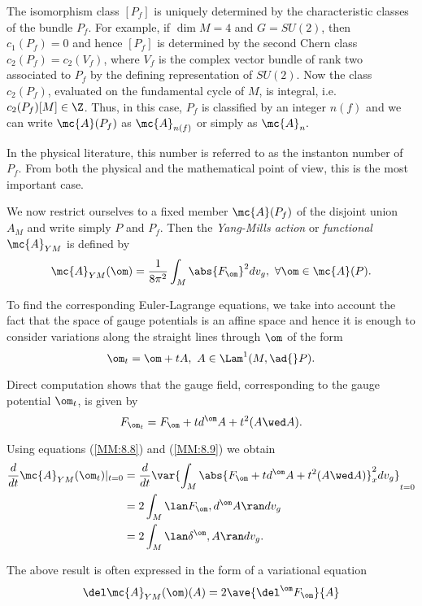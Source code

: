 The isomorphism class $[P_{f}]$ is uniquely determined by the characteristic classes of the bundle $P_{f}$. For
example, if $\dim M=4$ and $G=SU(2)$, then $c_{1}(P_{f})=0$ and hence $[P_{f}]$ is determined by the second Chern class
$c_{2}(P_{f})=c_{2}(V_{f})$, where $V_{f}$ is the complex vector bundle of rank two associated to $P_{f}$ by the
defining representation of $SU(2)$. Now the class $c_{2}(P_{f})$, evaluated on the fundamental cycle of $M$, is
integral, i.e. $c_{2}(P_{f})[M]\in \Z$. Thus, in this case, $P_{f}$ is classified by an integer $n(f)$ and we can write
$\mc{A}(P_{f})$ as $\mc{A}_{n(f)}$ or simply as $\mc{A}_{n}.$

In the physical literature, this number is referred to as the instanton number of $P_{f}$. From both the physical and
the mathematical point of view, this is the most important case.

We now restrict ourselves to a fixed member $\mc{A}(P_{f})$ of the disjoint union $A_{M}$ and write simply $P$ and
$P_{f}$. Then the \emph{Yang-Mills action} or \emph{functional} $\mc{A}_{YM}$ is defined by
\begin{equation}
 \label{MM:8.8}
 \mc{A}_{YM}(\om)=\frac{1}{8 \pi^{2}}\int_{M}\abs{F_{\om}}^{2}dv_{g}, \ \forall \om \in \mc{A}(P).
\end{equation}

To find the corresponding Euler-Lagrange equations, we take into account the fact that the space of gauge potentials is
an affine space and hence it is enough to consider variations along the straight lines through $\om$ of the form
$$
\om_{t}=\om+tA, \ A \in \Lam^{1}(M, \ad{} P).
$$

Direct computation shows that the gauge field, corresponding to the gauge potential $\om_{t}$, is given by
\begin{equation}
 \label{MM:8.9}
 F_{\om_{t}}=F_{\om}+td^{\om}A+t^{2}(A\wed A).
\end{equation}

Using equations (\ref{MM:8.8}) and (\ref{MM:8.9}) we obtain
\begin{align*}
 \frac{d}{dt}\mc{A}_{YM}(\om_{t})|_{t=0} &= \frac{d}{dt}\var{\int_{M}\abs{F_{\om}+td^{\om}A+t^{2}(A \wed
A)}_{x}^{2}dv_{g}}_{t=0} \\
&=2 \int_{M} \lan F_{\om}, d^{\om}A \ran dv_{g}\\
&=2 \int_{M} \lan \delta^{\om}, A \ran dv_{g}.
\end{align*}

The above result is often expressed in the form of a variational equation
\begin{equation}
 \label{8.10}
 \del \mc{A}_{YM}(\om)(A)=2\ave{\del^{\om}F_{\om}}{A}
\end{equation}

